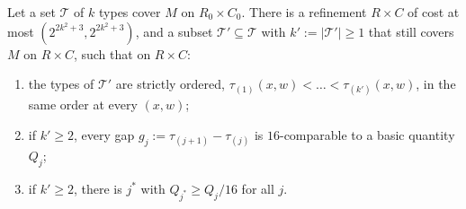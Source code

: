 \begin{lemma}\label{lem:NF}
Let a set $\mathcal T$ of $k$ types cover $M$ on $R_0\times C_0$. There is a refinement $R\times C$ of cost at
most $(2^{2k^2+3},2^{2k^2+3})$, and a subset $\mathcal T'\subseteq\mathcal T$ with $k':=|\mathcal T'|\ge1$
that still covers $M$ on $R\times C$, such that on $R\times C$:
\begin{enumerate}[label=(NF\arabic*)]
\item the types of $\mathcal T'$ are strictly ordered, $\tau_{(1)}(x,w)<\dots<\tau_{(k')}(x,w)$, in the same order at
  every $(x,w)$;
\item if $k'\ge2$, every gap $g_j:=\tau_{(j+1)}-\tau_{(j)}$ is $16$-comparable to a basic quantity $Q_j$;
\item if $k'\ge2$, there is $j^\ast$ with $Q_{j^\ast}\ge Q_j/16$ for all $j$.
\end{enumerate}
\end{lemma}
